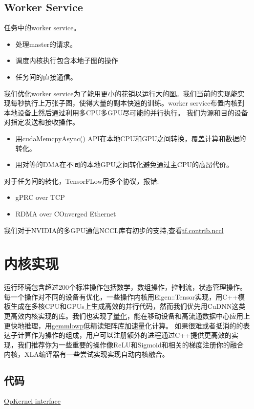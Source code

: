 \subsection{Worker Service}
任务中的worker service。
\begin{itemize}
\item 处理master的请求。
\item 调度内核执行包含本地子图的操作
\item 任务间的直接通信。
\end{itemize}
我们优化worker service为了能用更小的花销以运行大的图。我们当前的实现能实现每秒执行上万张子图，使得大量的副本快速的训练。worker service布置内核到本地设备上然后通过利用多CPU多GPU尽可能的并行执行。
我们为源和目的设备对指定发送和接收操作。
\begin{itemize}
\item 用cudaMemcpyAsync() API在本地CPU和GPU之间转换，覆盖计算和数据的转化。
\item 用对等的DMA在不同的本地GPU之间转化避免通过主CPU的高昂代价。
\end{itemize}
对于任务间的转化，TensorFLow用多个协议，报错:
\begin{itemize}
\item gPRC over TCP
\item RDMA over COnverged Ethernet
\end{itemize}
我们对于NVIDIA的多GPU通信NCCL库有初步的支持,查看\href{https://www.github.com/tensorflow/tensorflow/blob/r1.4/tensorflow/contrib/nccl/python/ops/nccl_ops.py}{tf.contrib.nccl}
\section{内核实现}
运行环境包含超过200个标准操作包括数学，数组操作，控制流，状态管理操作。每一个操作对不同的设备有优化，一些操作内核用Eigen::Tensor实现，用C++模板生成在多核CPU和GPUs上生成高效的并行代码，然而我们优先用CuDNN这类更高效内核实现的库。我们也实现了\href{https://www.tensorflow.org/performance/quantization}{量化}，能在移动设备和高流通数据中心应用上更快地推理，用\href{https://github.com/google/gemmlowp}{gemmlowp}低精读矩阵库加速量化计算。
如果很难或者抵消的的表达子计算作为操作的组成，用户可以注册额外的进程通过C++提供更高效的实现，我们推荐你为一些重要的操作像ReLU和Sigmoid和相关的梯度注册你的融合内核，XLA编译器有一些尝试实现实现自动内核融合。
\subsection{代码}
\href{https://www.github.com/tensorflow/tensorflow/blob/r1.4/tensorflow/core/framework/op_kernel.h}{OpKernel interface}
